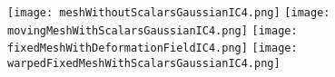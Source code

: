 \documentclass{InsightArticle}
\begin{document}
\begin{figure}
\center
\texttt{[image: meshWithoutScalarsGaussianIC4.png]}
\texttt{[image: movingMeshWithScalarsGaussianIC4.png]}
\texttt{[image: fixedMeshWithDeformationFieldIC4.png]}
\texttt{[image: warpedFixedMeshWithScalarsGaussianIC4.png]}
\label{fig:InputMeshes}
\end{figure}


\clearpage


%
%



\end{document}

